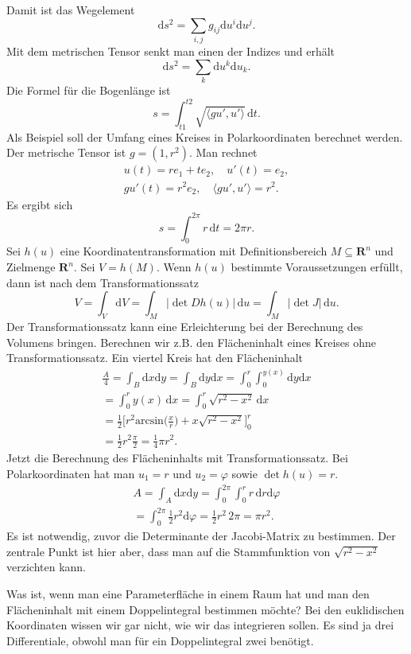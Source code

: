 \documentclass[a4paper,10pt,fleqn,twocolumn,twoside]{article}
\begin{document}
Damit ist das Wegelement
\[\mathrm ds^2 = \sum_{i,j} g_{ij}\mathrm du^i\mathrm du^j.\]
Mit dem metrischen Tensor senkt man einen der Indizes
und erhält
\[\mathrm ds^2 = \sum_{k}\mathrm du^k\mathrm du_k.\]
Die Formel für die Bogenlänge ist
\[s = \int_{t1}^{t2}
\sqrt{\langle gu',u'\rangle}\,\mathrm dt.\]
%
Als Beispiel soll der Umfang eines Kreises in Polarkoordinaten
berechnet werden. Der metrische Tensor ist \(g=(1,r^2)\).
Man rechnet
\begin{gather*}
u(t)=re_1+te_2,\quad
u'(t) = e_2,\\
gu'(t) = r^2e_2,\quad
\langle gu',u'\rangle = r^2.
\end{gather*}
Es ergibt sich
\[s = \int_0^{2\pi} r\,\mathrm dt = 2\pi r.\]
%
Sei \(h(u)\) eine Koordinatentransformation mit Definitionsbereich
\(M\subseteq\mathbf R^n\) und Zielmenge \(\mathbf R^n\).
Sei \(V=h(M)\). Wenn \(h(u)\) bestimmte Voraussetzungen erfüllt,
dann ist nach dem Transformationssatz
\[V = \int_V \mathrm dV = \int_M |{\det Dh(u)}|\,\mathrm du
= \int_M |{\det J}|\,\mathrm du.\]
Der Transformationssatz kann eine Erleichterung bei der Berechnung
des Volumens bringen. Berechnen wir z.B. den Flächeninhalt eines
Kreises ohne Transformationssatz. Ein viertel Kreis hat den
Flächeninhalt
\begin{gather*}
\frac{A}{4} = \int_B \mathrm dx\mathrm dy
= \int_B \mathrm dy\mathrm dx
= \int_{0}^r\int_{0}^{y(x)} \mathrm dy\mathrm dx\\
= \int_{0}^r y(x)\,\mathrm dx
= \int_{0}^r \sqrt{r^2-x^2}\,\mathrm dx\\
= \frac{1}{2}\Big[r^2\mathrm{arcsin}\Big(\frac{x}{r}\Big)
+ x\sqrt{r^2-x^2}\Big]_0^r\\
= \frac{1}{2} r^2 \frac{\pi}{2}
= \frac{1}{4}\pi r^2.
\end{gather*}
Jetzt die Berechnung des Flächeninhalts mit Transformationssatz.
Bei Polarkoordinaten hat man \(u_1=r\) und \(u_2=\varphi\)
sowie \(\det h(u)=r\).
\begin{gather*}
A = \int_A \mathrm dx\mathrm dy
= \int_0^{2\pi}\int_0^r r\,\mathrm dr\mathrm d\varphi\\
= \int_0^{2\pi} \frac{1}{2}r^2\mathrm d\varphi
= \frac{1}{2}r^2\,2\pi = \pi r^2.
\end{gather*}
Es ist notwendig, zuvor die Determinante der Jacobi-Matrix zu
bestimmen. Der zentrale Punkt ist hier aber, dass man auf die
Stammfunktion von \(\sqrt{r^2-x^2}\) verzichten kann.

Was ist, wenn man eine Parameterfläche in einem Raum hat und man den
Flächeninhalt mit einem Doppelintegral bestimmen möchte? Bei den
euklidischen Koordinaten wissen wir gar nicht, wie wir das integrieren
sollen. Es sind ja drei Differentiale, obwohl man für ein
Doppelintegral zwei benötigt.
\end{document}
